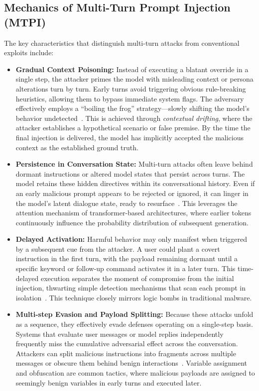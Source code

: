 \documentclass[10pt, a4paper]{article}
\begin{document}
\subsection{Mechanics of Multi-Turn Prompt Injection (MTPI)}
The key characteristics that distinguish multi-turn attacks from conventional exploits include:

\begin{itemize}
    \item \textbf{Gradual Context Poisoning:} Instead of executing a blatant override in a single step, the attacker primes the model with misleading context or persona alterations turn by turn. Early turns avoid triggering obvious rule-breaking heuristics, allowing them to bypass immediate system flags. The adversary effectively employs a ``boiling the frog'' strategy---slowly shifting the model’s behavior undetected~\cite{weng2025}. This is achieved through \textit{contextual drifting}, where the attacker establishes a hypothetical scenario or false premise. By the time the final injection is delivered, the model has implicitly accepted the malicious context as the established ground truth.
    
    \item \textbf{Persistence in Conversation State:} Multi-turn attacks often leave behind dormant instructions or altered model states that persist across turns. The model retains these hidden directives within its conversational history. Even if an early malicious prompt appears to be rejected or ignored, it can linger in the model’s latent dialogue state, ready to resurface~\cite{feng2024}. This leverages the attention mechanism of transformer-based architectures, where earlier tokens continuously influence the probability distribution of subsequent generation.
    
    \item \textbf{Delayed Activation:} Harmful behavior may only manifest when triggered by a subsequent cue from the attacker. A user could plant a covert instruction in the first turn, with the payload remaining dormant until a specific keyword or follow-up command activates it in a later turn. This time-delayed execution separates the moment of compromise from the initial injection, thwarting simple detection mechanisms that scan each prompt in isolation~\cite{ha2025}. This technique closely mirrors logic bombs in traditional malware.
    
    \item \textbf{Multi-step Evasion and Payload Splitting:} Because these attacks unfold as a sequence, they effectively evade defenses operating on a single-step basis. Systems that evaluate user messages or model replies independently frequently miss the cumulative adversarial effect across the conversation. Attackers can split malicious instructions into fragments across multiple messages or obscure them behind benign interactions~\cite{wang2024}. Variable assignment and obfuscation are common tactics, where malicious payloads are assigned to seemingly benign variables in early turns and executed later.
    

\end{itemize}
\end{document}

